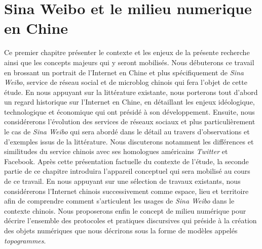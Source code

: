 ﻿\chapter{Sina Weibo et le milieu numerique en Chine} 

Ce premier chapitre présenter le contexte et les enjeux de la présente recherche ainsi que les concepts majeurs qui y seront mobilisés. Nous débuterons ce travail en brossant un portrait de l’Internet en Chine et plus spécifiquement de \textit{Sina Weibo}, service de réseau social et de microblog chinois qui fera l’objet de cette étude. En nous appuyant sur la littérature existante, nous porterons tout d’abord un regard historique sur l’Internet en Chine, en détaillant les enjeux idéologique, technologique et économique qui ont présidé à son développement. Ensuite, nous considérerons l’évolution des services de réseaux sociaux et plus particulièrement le cas de \textit{Sina Weibo} qui sera abordé dans le détail au travers d’observations et d’exemples issus de la littérature. Nous discuterons notamment les différences et similitudes du service chinois avec ses homologues américains \textit{Twitter} et Facebook. Après cette présentation factuelle du contexte de l’étude, la seconde partie de ce chapitre introduira l’appareil conceptuel qui sera mobilisé au cours de ce travail. En nous appuyant sur une sélection de travaux existants, nous considérerons l’Internet chinois successivement comme espace, lieu et territoire afin de comprendre comment s’articulent les usages de \textit{Sina Weibo} dans le contexte chinois. Nous proposerons enfin le concept de milieu numérique pour décrire l’ensemble des protocoles et pratiques discursives qui préside à la création des objets numériques que nous décrirons sous la forme de modèles appelés \textit{topogrammes}.


